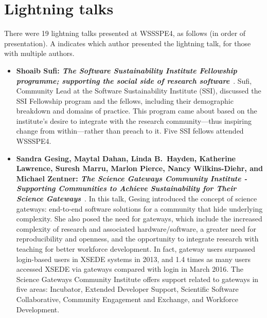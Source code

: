 \documentclass[11pt, oneside]{amsart}
\newcommand{\note}[1]{ {\textcolor{blueish}    { ***Note:      #1 }}}
\begin{document}
\section{Lightning talks} \label{sec:lightning}
\begin{comment}
\note{
\href{http://wssspe.researchcomputing.org.uk/wssspe4/agenda/}{Slides.}}
\end{comment}

There were 19 lightning talks presented at WSSSPE4, as follows (in order of
presentation).
%
A \textsuperscript{\textasteriskcentered} indicates which author presented the
lightning talk, for those with multiple authors.
%
\begin{itemize}[itemsep=1ex]
    \item \textbf{Shoaib Sufi: \emph{The Software Sustainability Institute Fellowship
    programme; supporting the social side of research software}}~\cite{Sufi:2016ws}.
    Sufi, Community Lead at the Software Sustainability Institute (SSI), discussed
    the SSI Fellowship program and the fellows, including their
    demographic breakdown and domains of practice. This program came about
    based on the institute's desire to integrate with the research community---thus
    inspiring change from within---rather than preach to it. Five SSI fellows
    attended WSSSPE4.

    \item \textbf{Sandra Gesing, Maytal Dahan, Linda B.~Hayden, Katherine Lawrence,
    Suresh Marru, Marlon Pierce, Nancy Wilkins-Diehr, and Michael Zentner:
    \emph{The Science Gateways Community Institute - Supporting Communities to
    Achieve Sustainability for Their Science Gateways}}~\cite{Gesing:2016ws}.
    In this talk, Gesing introduced the concept of science gateways: end-to-end software
    solutions for a community that hide underlying complexity. She also posed the need
    for gateways, which include the increased complexity of research and associated
    hardware\slash software, a greater need for reproducibility and openness, and the
    opportunity to integrate research with teaching for better workforce development.
    In fact, gateway users surpassed login-based users in XSEDE systems in 2013,
    and 1.4 times as many users accessed XSEDE via gateways compared with
    login in March 2016. The Science Gateways Community Institute offers support
    related to gateways in five areas: Incubator, Extended Developer Support, Scientific
    Software Collaborative, Community Engagement and Exchange, and Workforce
    Development.


\end{itemize}
\end{document}
